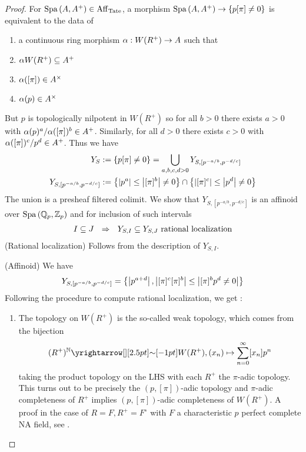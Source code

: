 \documentclass{article}
\begin{document}
\begin{proof}
  For $\mathrm{Spa}\,(A , A^+) \in \mathrm{Aff}_{\mathrm{Tate}}$,
  a morphism $\mathrm{Spa}\,(A , A^+) \to \left\{p [\pi] \neq 0\right\}$
  is equivalent to the data of 
  \begin{enumerate}
    \item a continuous ring morphism $\alpha : W(R^+) \to A$ such that
    \item $\alpha W(R^+) \subseteq A^+$
    \item $\alpha([\pi]) \in A^\times$
    \item $\alpha(p) \in A^\times$
  \end{enumerate}
  But $p$ is topologically nilpotent in $W(R^+)$ 
  so for all $b > 0$ there exists
  $a > 0$ with $\alpha(p)^a / \alpha([\pi])^b \in A^+$.
  Similarly, for all $d > 0$ there exists $c > 0$ with
  $\alpha([\pi])^c / p^d \in A^+$.
  Thus we have \begin{align*}
    Y_S &:= \left\{p [\pi] \neq 0\right\} = 
    \bigcup_{a, b, c, d > 0} Y_{S , [p^{- a / b} , p^{- d / c}]} \\
    Y_{S , [p^{- a / b} , p^{- d / c}]} 
      &:= \left\{\left\vert p^a \right\vert \leq \left\vert [\pi]^b \right\vert \neq 0\right\} \cap 
    \left\{\left\vert [\pi]^c \right\vert \leq \left\vert p^d \right\vert \neq 0\right\}
  \end{align*}
  The union is a presheaf filtered colimit.
  We show that $Y_{S , [p^{- a / b} , p^{- d / c}]}$
  is an affinoid over $\mathrm{Spa}\,(\mathbb{Q}_p , \mathbb{Z}_p)$
  and for inclusion of such intervals
  \begin{align*}
    I \subseteq J
    \,\,\,\,\Rightarrow \,\,\,\,
    Y_{S, I} \subseteq 
    Y_{S , J}
    \text{ rational localization}
  \end{align*}
  (Rational localization) 
  Follows from the description of $Y_{S , I}$.

  (Affinoid) We have \begin{align*}
    Y_{S, [p^{- a / b} , p^{- d / c}]}
    = \left\{
      \left\vert {p}^{a + d} \right\vert , \left\vert [\pi]^{c}[\pi]^b \right\vert \leq \left\vert [\pi]^b p^d \neq 0 \right\vert
      \right\}
  \end{align*}
  Following the procedure to compute rational localization, we get : 
  \begin{enumerate}
    \item The topology on $W(R^+)$ is the so-called weak topology,
    which comes from the bijection \[
      (R^+)^{\bN} \map{\sim}{} W(R^+) , (x_n) \mapsto \sum_{n = 0}^\infty [x_n] p^n
    \]
    taking the product topology on the LHS with each $R^+$ 
    the $\pi$-adic topology.
    This turns out to be precisely the $(p , [\pi])$-adic topology
    and $\pi$-adic completeness of $R^+$ implies
    $(p , [\pi])$-adic completeness of $W(R^+)$.
    A proof in the case of $R = F , R^+ = F^\circ$
    with $F$ a characteristic $p$ perfect complete NA field,
    see \cite[Prop. 1.4.11]{FF18}.


\end{enumerate}
\end{proof}
\end{document}

